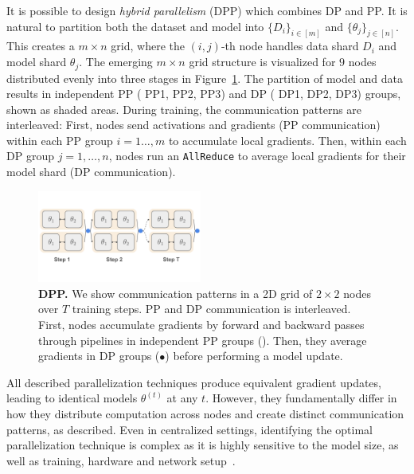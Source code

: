\documentclass{article}
\newcommand{\orangebox}{\colorbox{oorange!50}{\hspace{0.3em}}}
\newcommand{\bluecircle}{\textcolor{bblue}{\LARGE$\bullet$}}
\begin{document}

It is possible to design \textit{hybrid parallelism} (DPP) which combines DP and
PP. It is natural to partition both the dataset and model into $\{D_i\}_{i\in
[m]}$ and $\{\theta_j\}_{j\in [n]}$. This creates a $m\times n$ grid, where the
$(i,j)$-th node handles data shard $D_i$ and model shard $\theta_j$. The
emerging $m\times n$ grid structure is visualized for $9$ nodes distributed
evenly into three stages in Figure~\ref{fig:dpp}. The partition of model and
data results in independent PP ({\color{oorange} PP1, PP2, PP3}) and DP
({\color{bblue} DP1, DP2, DP3}) groups, shown as shaded areas. During training,
the communication patterns are interleaved: First, nodes send activations and
gradients (PP communication) within each PP group $i=1\dots,m$ to accumulate
local gradients. Then, within each DP group $j=1,\dots,n$, nodes run an
\texttt{AllReduce} to average local gradients for their model shard (DP
communication). 

\begin{figure}[ht]
    \centering
    \vspace{0.5cm}
    \includegraphics[width=0.48\textwidth]{figures/dpp.pdf}
    \caption{\textbf{DPP.} We show communication patterns in a 2D grid of
    $2\times2$ nodes over $T$ training steps. PP and DP communication is
    interleaved.  First, nodes accumulate gradients by forward and backward
    passes through pipelines in independent PP groups (\mbox{\orangebox}). Then,
    they average gradients in DP groups (\mbox{\bluecircle}) before performing a
    model update.}
    \label{fig:dpp}
\end{figure}

All described parallelization techniques produce equivalent gradient updates,
leading to identical models $\theta^{(t)}$ at any $t$. However, they
fundamentally differ in how they distribute computation across nodes and create
distinct communication patterns, as described. Even in centralized settings,
identifying the optimal parallelization technique is complex as it is highly
sensitive to the model size, as well as training, hardware and network
setup~\cite{hagemann2024parallelization, fernandez2024scalingtrends}.
\end{document}
